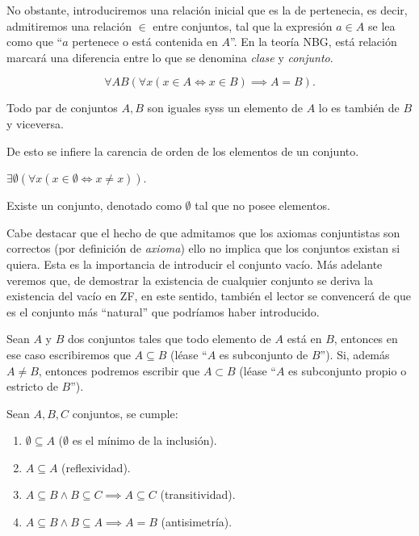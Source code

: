 \documentclass[11pt,a4paper]{book}
\begin{document}
No obstante, introduciremos una relación inicial que es la de pertenecia, es decir, admitiremos una relación $\in$ entre conjuntos, tal que la expresión $a\in A$ se lea como que ``$a$ pertenece o está contenida en $A$''. En la teoría NBG, está relación marcará una diferencia entre lo que se denomina \textit{clase} y \textit{conjunto}.
\begin{axiom}[de Extensionalidad (ZF-1)]
	$$\forall AB(\forall x(x\in A\iff x\in B)\implies A=B).$$

	Todo par de conjuntos $A,B$ son iguales syss un elemento de $A$ lo es también de $B$ y viceversa.
\end{axiom}
De esto se infiere la carencia de orden de los elementos de un conjunto.
\begin{axiom}
	$\exists\emptyset(\forall x(x\in\emptyset\iff x\neq x))$.

	Existe un conjunto, denotado como $\emptyset$ tal que no posee elementos.
\end{axiom}
Cabe destacar que el hecho de que admitamos que los axiomas conjuntistas son correctos (por definición de \textit{axioma}) ello no implica que los conjuntos existan si quiera. Esta es la importancia de introducir el conjunto vacío. Más adelante veremos que, de demostrar la existencia de cualquier conjunto se deriva la existencia del vacío en ZF, en este sentido, también el lector se convencerá de que es el conjunto más ``natural'' que podríamos haber introducido.
\begin{mydef}[Subconjunto]
	Sean $A$ y $B$ dos conjuntos tales que todo elemento de $A$ está en $B$, entonces en ese caso escribiremos que $A\subseteq B$ (léase ``$A$ es subconjunto de $B$''). Si, además $A\neq B$, entonces podremos escribir que $A\subset B$ (léase ``$A$ es subconjunto propio o estricto de $B$'').
\end{mydef}
\begin{prop}
	Sean $A,B,C$ conjuntos, se cumple:
	\begin{enumerate}[$a)$]
		\item $\emptyset\subseteq A$ ($\emptyset$ es el mínimo de la inclusión).
		\item $A\subseteq A$ (reflexividad).
		\item $A\subseteq B\wedge B\subseteq C\implies A\subseteq C$ (transitividad).
		\item $A\subseteq B\wedge B\subseteq A\implies A=B$ (antisimetría).
	\end{enumerate}
\end{prop}
\end{document}
